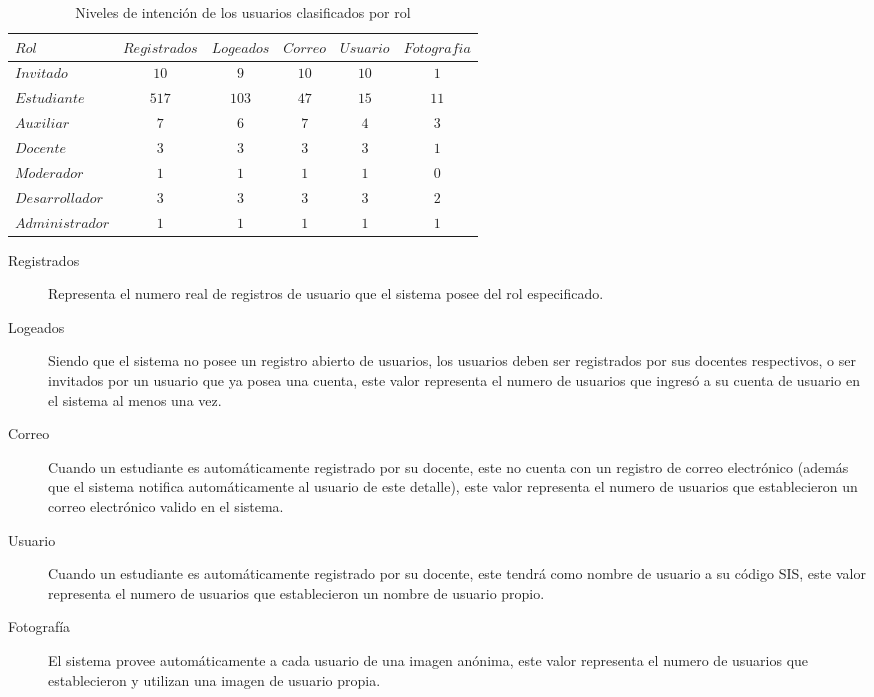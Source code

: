 \begin{table}
\centering
\begin{tabular}{l|c c c c c}
$Rol$ & $Registrados$ & $Logeados$ & $Correo$ & $Usuario$ & $Fotografia$ \\
\hline
$Invitado$      & $ 10$ & $  9$ & $10$ & $10$ & $ 1$ \\
$Estudiante$    & $517$ & $103$ & $47$ & $15$ & $11$ \\
$Auxiliar$      & $  7$ & $  6$ & $ 7$ & $ 4$ & $ 3$ \\
$Docente$       & $  3$ & $  3$ & $ 3$ & $ 3$ & $ 1$ \\
$Moderador$     & $  1$ & $  1$ & $ 1$ & $ 1$ & $ 0$ \\
$Desarrollador$ & $  3$ & $  3$ & $ 3$ & $ 3$ & $ 2$ \\
$Administrador$ & $  1$ & $  1$ & $ 1$ & $ 1$ & $ 1$ \\
\end{tabular}
\caption{Niveles de intención de los usuarios clasificados por rol}
\label{usuarios_tabla_1}
\end{table}

\begin{description}
\item [Registrados] Representa el numero real de registros de usuario que el
sistema posee del rol especificado.
\item [Logeados] Siendo que el sistema no posee un registro abierto de usuarios,
los usuarios deben ser registrados por sus docentes respectivos, o ser invitados
por un usuario que ya posea una cuenta, este valor representa el numero de
usuarios que ingresó a su cuenta de usuario en el sistema al menos una vez.
\item [Correo] Cuando un estudiante es automáticamente registrado por su
docente, este no cuenta con un registro de correo electrónico (además que el
sistema notifica automáticamente al usuario de este detalle), este valor
representa el numero de usuarios que establecieron un correo electrónico valido
en el sistema.
\item [Usuario] Cuando un estudiante es automáticamente registrado por su
docente, este tendrá como nombre de usuario a su código SIS, este valor
representa el numero de usuarios que establecieron un nombre de usuario propio.
\item [Fotografía] El sistema provee automáticamente a cada usuario de una
imagen anónima, este valor representa el numero de usuarios que establecieron
y utilizan una imagen de usuario propia.
\end{description}

